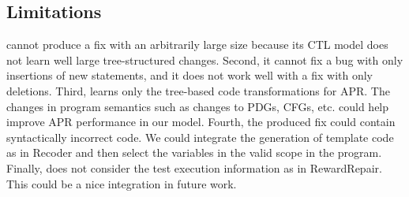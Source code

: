 \subsection{Limitations}
\label{sec:limitations}



{\tool} cannot produce a fix with an arbitrarily large size because
its CTL model does not learn well large tree-structured
changes. Second, it cannot fix a bug with only insertions of new
statements, and it does not work well with a fix with only deletions.
%
Third, {\tool} learns only the tree-based code transformations for
APR. The changes in program semantics such as changes to PDGs, CFGs,
etc. could help improve APR performance in our model. Fourth, the
produced fix could contain syntactically incorrect code. We could
integrate the generation of template code as in Recoder and then
select the variables in the valid scope in the program. Finally,
{\tool} does not consider the test execution information as in
RewardRepair. This could be a nice integration in future work.

